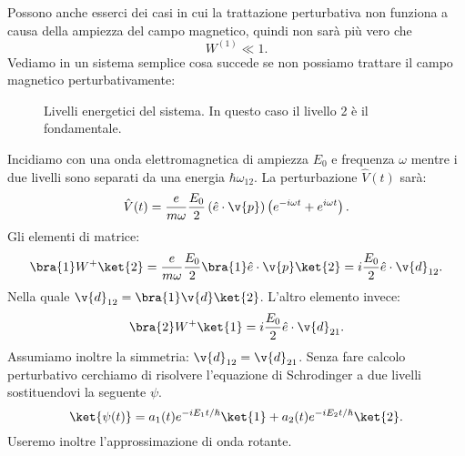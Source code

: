 Possono anche esserci dei casi in cui la trattazione perturbativa non funziona a causa della ampiezza del campo magnetico, quindi non sarà più vero che
\[
    W^{(1)}\ll 1
.\] 
Vediamo in un sistema semplice cosa succede se non possiamo trattare il campo magnetico perturbativamente:
\begin{figure}[ht]
    \centering
    \caption{Livelli energetici del sistema. In questo caso il livello 2 è il fondamentale.}
    \label{fig:livelliarimondo}
\end{figure}
Incidiamo con una onda elettromagnetica di ampiezza $E_0$ e frequenza $\omega$ mentre i due livelli sono separati da una energia $\hbar \omega_{12}$. La perturbazione $\hat{V}(t) $ sarà:
\[
    \hat{V}(t) = \frac{e}{m\omega} \frac{E_0}{2}\left(\hat{e}\cdot \v{p}\right)
    \left(e^{-i\omega t}+e^{i\omega t}\right)
.\] 
Gli elementi di matrice:
\[
\bra{1}W^+ \ket{2}= \frac{e}{m\omega}\frac{E_0}{2}\bra{1}\hat{e}\cdot \v{p}\ket{2}=
i \frac{E_0}{2}\hat{e}\cdot \v{d}_{12} 
.\] 
Nella quale $\v{d}_{12} = \bra{1}\v{d} \ket{2}$. L'altro elemento invece:
\[
\bra{2}W^+ \ket{1}=
i \frac{E_0}{2}\hat{e}\cdot \v{d}_{21} 
.\] 
Assumiamo inoltre la simmetria: $\v{d}_{12}=\v{d}_{21}$. Senza fare calcolo perturbativo cerchiamo di risolvere l'equazione di Schrodinger a due livelli sostituendovi la seguente $\psi$.
\[
    \ket{\psi(t) }=
    a_1(t) e^{-iE_1t /\hbar }\ket{1}+a_2(t) e^{-i E_2t /\hbar }\ket{2}
.\] 
Useremo inoltre l'approssimazione di onda rotante.
